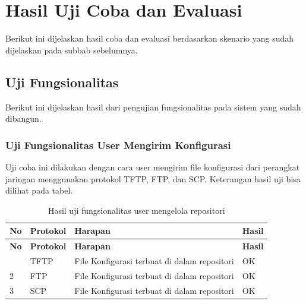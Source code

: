 \section{Hasil Uji Coba dan Evaluasi}
	Berikut ini dijelaskan hasil coba dan evaluasi berdasarkan skenario yang sudah dijelaskan pada subbab sebelumnya.
	
	\subsection{Uji Fungsionalitas}
	Berikut ini dijelaskan hasil dari pengujian fungsionalitas pada sistem yang sudah dibangun.
	\subsubsection{Uji Fungsionalitas User Mengirim Konfigurasi}
	Uji coba ini dilakukan dengan cara user mengirim file konfigurasi dari perangkat jaringan menggunakan protokol TFTP, FTP, dan SCP. Keterangan hasil uji bisa dilihat pada tabel.
	\begin{longtable}{|p{}|p{}|p{}|p{}|}
		
		\caption{Hasil uji fungsionalitas user mengelola repositori} \label{hasilmengelolaRepositori} \\
		\hline
		\textbf{No} & \textbf{Protokol} & \textbf{Harapan} & \textbf{Hasil} \\ \hline
		\endfirsthead
		
		\hline
		\textbf{No} & \textbf{Protokol} & \textbf{Harapan} & \textbf{Hasil} \\ \hline
		\endhead
		\endfoot
		\endlastfoot
		1 & TFTP & File Konfigurasi terbuat di dalam repositori & OK\\ \hline
		2 & FTP & File Konfigurasi terbuat di dalam repositori & OK\\ \hline
		3 & SCP & File Konfigurasi terbuat di dalam repositori & OK\\ \hline
		
	\end{longtable}
	
